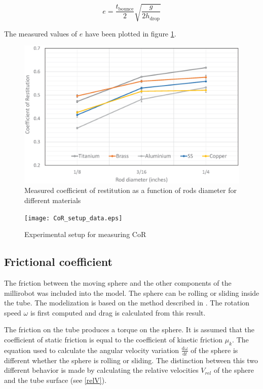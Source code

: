 \documentclass[letterpaper, 10 pt, conference]{ieeeconf}  %
\begin{document}
\begin{equation}
e=\frac{t_{\text{bounce}}}{2}  \sqrt{\frac{g}{2 h_{\text{drop}}}}
\label{CoRequation}
\end{equation}

The measured values of $e$ have been plotted in figure \ref{CoR_Results}.


\begin{figure}
	\includegraphics[width=\columnwidth]{CoR_measurements.eps}
	\caption{Measured coefficient of restitution as a function of rods diameter for different materials}
	\label{CoR_Results}
\end{figure}

\begin{figure}
	\texttt{[image: CoR\_setup\_data.eps]}
	\caption{Experimental setup for measuring CoR}
	\label{CoR_setup_data}
\end{figure}

\subsection{Frictional coefficient}

The friction between the moving sphere and the other components of the millirobot was included into the model. The sphere can be rolling or sliding inside the tube. The modelization is based on the method described in \cite{00319120303009}. The rotation speed $\omega$ is first computed and drag is calculated from this result.\par
The friction on the tube produces a torque on the sphere. It is assumed that the coefficient of static friction is equal to the coefficient of kinetic friction $\mu_k$. The equation used to calculate the angular velocity variation $\frac{\mathrm{d\omega } }{\mathrm{d} t}$ of the sphere is different whether the sphere is rolling or sliding. The distinction between this two different behavior is made by calculating the relative velocities $V_{rel}$ of the sphere and the tube surface (see \cref{relV}). \par
\end{document}
